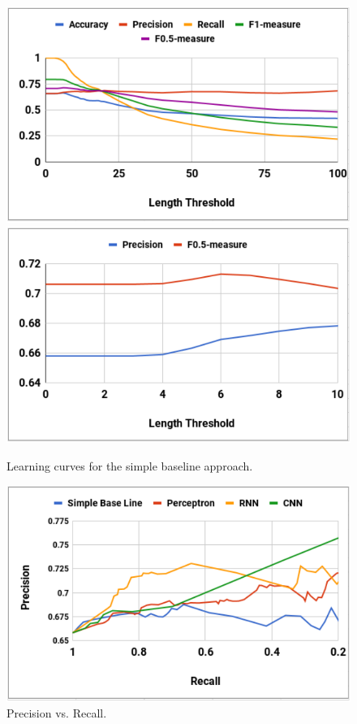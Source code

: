 \begin{figure}[H]
\centering
\includegraphics[scale=0.58]{figures/result_simple1.pdf}
\includegraphics[scale=0.58]{figures/result_simple2.pdf}
\caption{Learning curves for the simple baseline approach.}
\label{fig:learning curve of simple baseline}
\end{figure}

\begin{figure}[H]
\centering
\includegraphics[width=\columnwidth]{figures/precision_recall.pdf}
\caption{Precision vs. Recall.}
\label{fig:precision vs recall}
\end{figure}

